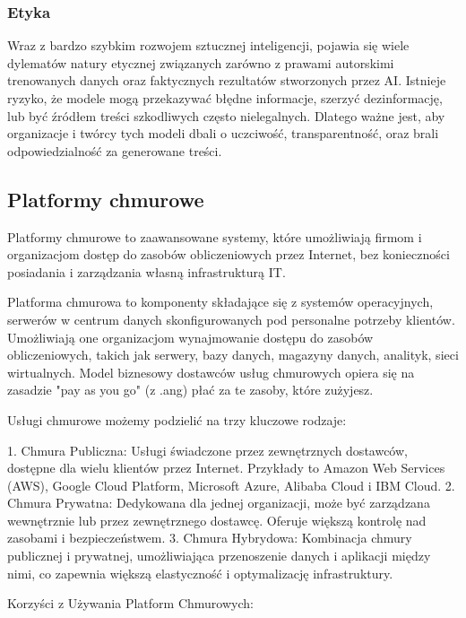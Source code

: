 \subsubsection{Etyka}
Wraz z bardzo szybkim rozwojem sztucznej inteligencji, pojawia się wiele dylematów natury etycznej związanych zarówno z prawami autorskimi trenowanych danych oraz faktycznych rezultatów stworzonych przez AI. Istnieje ryzyko, że modele mogą przekazywać błędne informacje, szerzyć dezinformację, lub być źródłem treści szkodliwych często nielegalnych. Dlatego ważne jest, aby organizacje i twórcy tych modeli dbali o uczciwość, transparentność, oraz brali odpowiedzialność za generowane treści.

\clearpage

\subsection{Platformy chmurowe}
Platformy chmurowe to zaawansowane systemy, które umożliwiają firmom i organizacjom dostęp do zasobów obliczeniowych przez Internet, bez konieczności posiadania i zarządzania własną infrastrukturą IT.

Platforma chmurowa to komponenty składające się z systemów operacyjnych, serwerów w centrum danych skonfigurowanych pod personalne potrzeby klientów. Umożliwiają one organizacjom wynajmowanie dostępu do zasobów obliczeniowych, takich jak serwery, bazy danych, magazyny danych, analityk, sieci wirtualnych. Model biznesowy dostawców usług chmurowych opiera się na zasadzie "pay as you go" (z .ang) płać za te zasoby, które zużyjesz.

Usługi chmurowe możemy podzielić na trzy kluczowe rodzaje:

1. Chmura Publiczna: Usługi świadczone przez zewnętrznych dostawców, dostępne dla wielu klientów przez Internet. Przykłady to Amazon Web Services (AWS), Google Cloud Platform, Microsoft Azure, Alibaba Cloud i IBM Cloud.
2. Chmura Prywatna: Dedykowana dla jednej organizacji, może być zarządzana wewnętrznie lub przez zewnętrznego dostawcę. Oferuje większą kontrolę nad zasobami i bezpieczeństwem.
3. Chmura Hybrydowa: Kombinacja chmury publicznej i prywatnej, umożliwiająca przenoszenie danych i aplikacji między nimi, co zapewnia większą elastyczność i optymalizację infrastruktury.

Korzyści z Używania Platform Chmurowych:

